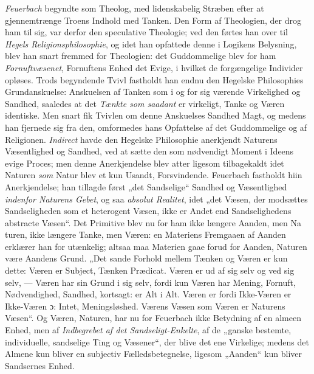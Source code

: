 \emph{Feuerbach} begyndte som Theolog, med lidenskabelig Stræben efter at
gjennemtrænge Troens Indhold med Tanken. Den Form af Theologien, der drog ham
til sig, var derfor den speculative Theologie; ved den førtes han over til
\emph{Hegels Religionsphilosophie}, og idet han opfattede denne i Logikens
Belysning, blev han snart fremmed for Theologien: det Guddommelige blev for ham
\emph{Fornuftvæsenet}, Fornuftens Enhed det Evige, i hvilket de forgængelige
Individer opløses. Trods begyndende Tvivl fastholdt han endnu den Hegelske
Philosophies Grundanskuelse: Anskuelsen af Tanken som i og for sig værende
Virkelighed og Sandhed, saaledes at det \emph{Tænkte som saadant} er virkeligt,
Tanke og Væren identiske. Men snart fik Tvivlen om denne Anskuelses Sandhed
Magt, og medens han fjernede sig fra den, omformedes hans Opfattelse af det
Guddommelige og af Religionen. \emph{Indirect} havde den Hegelske Philosophie
anerkjendt Naturens Væsentlighed og Sandhed, ved at sætte den som nødvendigt
Moment i Ideens evige Proces; men denne Anerkjendelse blev atter ligesom
tilbagekaldt idet Naturen \emph{som} Natur blev et kun Usandt, Forsvindende.
Feuerbach fastholdt hiin Anerkjendelse; han tillagde først „det Sandselige“
Sandhed og Væsentlighed \emph{indenfor Naturens Gebet}, og saa \emph{absolut
Realitet}, idet „det Væsen, der modsættes Sandseligheden som et heterogent
Væsen, ikke er Andet end Sandselighedens abstracte Væsen“. Det Primitive blev
nu for ham ikke længere Aanden, men Na\-%
turen, ikke længere Tanke, men Væren: en Materiens Fremgaaen af Aanden erklærer
han for utænkelig; altsaa maa Materien gaae forud for Aanden, Naturen være
Aandens Grund. „Det sande Forhold mellem Tænken og Væren er kun dette: Væren er
Subject, Tænken Prædicat. Væren er ud af sig selv og ved sig selv, --- Væren
har sin Grund i sig selv, fordi kun Væren har Mening, Fornuft, Nødvendighed,
Sandhed, kortsagt: er Alt i Alt. Væren er fordi Ikke-Væren er Ikke-Væren ɔ:
Intet, Meningsløshed. Værens Væsen som Væren er Naturens Væsen“. Og Væren,
Naturen, har nu for Feuerbach ikke Betydning af en almeen Enhed, men af
\emph{Indbegrebet af det Sandseligt-Enkelte}, af de „ganske bestemte,
individuelle, sandselige Ting og Væsener“, der blive det ene Virkelige; medens
det Almene kun bliver en subjectiv Fælledsbetegnelse, ligesom „Aanden“ kun
bliver Sandsernes Enhed.

